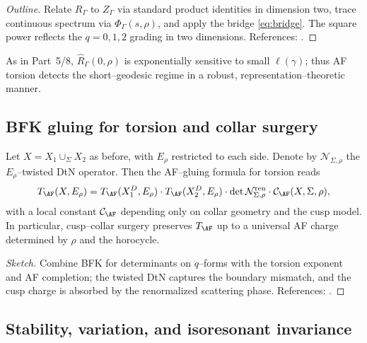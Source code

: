 \begin{proof}[Outline]
Relate $R_\Gamma$ to $Z_\Gamma$ via standard product identities in dimension two, trace continuous spectrum via $\Phi_\Gamma(s,\rho)$, and apply the bridge \eqref{eq:bridge}. The square power reflects the $q=0,1,2$ grading in two dimensions. References: \cite{Fried1986,HejhalII,Borthwick}. %
\end{proof}

\begin{remark}
As in Part~5/8, $\widehat{R}_\Gamma(0,\rho)$ is exponentially sensitive to small $\ell(\gamma)$; thus AF torsion detects the short–geodesic regime in a robust, representation–theoretic manner. %
\end{remark}

\subsection{BFK gluing for torsion and collar surgery}
\label{subsec:glue-torsion}
\relax\hspace{0pt}

Let $X=X_1\cup_\Sigma X_2$ as before, with $E_\rho$ restricted to each side. Denote by $\mathcal{N}_{\Sigma,\rho}$ the $E_\rho$–twisted DtN operator. Then the AF–gluing formula for torsion reads
\begin{equation}\label{eq:bfk-torsion}
T_{\AF}(X,E_\rho)
= T_{\AF}(X_1^D,E_\rho)\cdot T_{\AF}(X_2^D,E_\rho)\cdot \det\mathcal{N}^{\mathrm{ren}}_{\Sigma,\rho}\cdot \mathcal{C}_{\AF}(X,\Sigma,\rho),
\end{equation}
with a local constant $\mathcal{C}_{\AF}$ depending only on collar geometry and the cusp model. In particular, cusp–collar surgery preserves $T_{\AF}$ up to a universal AF charge determined by $\rho$ and the horocycle. %

\begin{proof}[Sketch]
Combine BFK for determinants on $q$–forms with the torsion exponent and AF completion; the twisted DtN captures the boundary mismatch, and the cusp charge is absorbed by the renormalized scattering phase. References: \cite{BFK1992,Borthwick,Muller1992}. %
\end{proof}

\subsection{Stability, variation, and isoresonant invariance}
\label{subsec:stability-torsion}
\relax\hspace{0pt}

